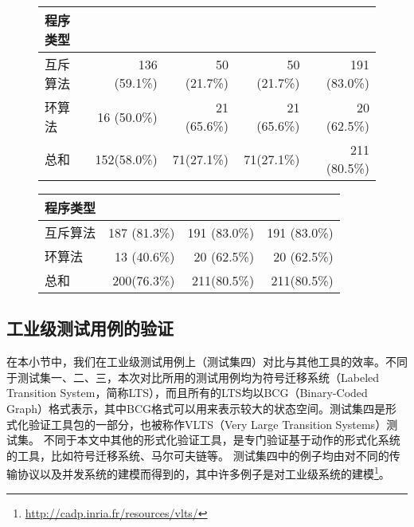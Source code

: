 \begin{figure}[h!]
	\small
	\centering
	\setlength{\tabcolsep}{3pt}
	\begin{tabular}{| l | r | r | r | r |}
		\hline
		\textbf{程序类型} & \verds{} & \nusmv{} & \nuxmv{} &  \sctl{} \\
		\hline
		{互斥算法} & 136 (59.1\%) & 50 (21.7\%) & 50 (21.7\%) & 191 (83.0\%)  \\
		\hline
		{环算法} & 16 (50.0\%) & 21 (65.6\%) & 21 (65.6\%) & 20 (62.5\%) \\
		\hline
		总和 & 152(58.0\%) & 71(27.1\%) & 71(27.1\%) & 211 (80.5\%)\\
		\hline
	\end{tabular}	
	\label{tabl:solvable:mutual:ring}
	\vspace{0.5cm}
\end{figure}
\begin{figure}[h!]
	\small
	\centering
	\setlength{\tabcolsep}{3pt}
	\begin{tabular}{| l | r | r | r |}
		\hline
		\textbf{程序类型} & \verds{} & \nusmv{} & \nuxmv{}  \\
		\hline
		{互斥算法} & 187 (81.3\%) & 191 (83.0\%) & 191 (83.0\%)   \\
		\hline
		{环算法} & 13 (40.6\%) & 20 (62.5\%) & 20 (62.5\%)  \\
		\hline
		总和 & 200(76.3\%) & 211(80.5\%) & 211(80.5\%) \\
		\hline
	\end{tabular}
	\label{tabl:compare:mutual:ring}
\end{figure}

\subsection{工业级测试用例的验证}	\label{subsc:vlts}
在本小节中，我们在工业级测试用例上（测试集四）对比\sctl{}与其他工具的效率。不同于测试集一、二、三，本次对比所用的测试用例均为符号迁移系统（Labeled Transition System，简称\textsf{LTS}），而且所有的\textsf{LTS}均以\textsf{BCG}（Binary-Coded Graph）格式表示，其中\textsf{BCG}格式可以用来表示较大的状态空间。测试集四是形式化验证工具包\CADP{}\cite{GaravelLMS13}的一部分，也被称作\textsf{VLTS}（Very Large Transition Systems）测试集。
不同于本文中其他的形式化验证工具，\CADP{}是专门验证基于动作的形式化系统的工具，比如符号迁移系统、马尔可夫链等。
测试集四中的例子均由对不同的传输协议以及并发系统的建模而得到的，其中许多例子是对工业级系统的建模\footnote{\url{http://cadp.inria.fr/resources/vlts/}}。

